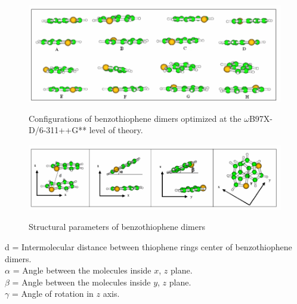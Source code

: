 	
	\begin{figure}[H]
		\centering
		\includegraphics[scale=0.88]{image/image/P1-F6} \label{P1-F6}
		\caption{Configurations of benzothiophene dimers optimized at the $\omega$B97X-D/6-311++G** level of theory.}
	\end{figure}
	
	\begin{figure}[H]
		\centering
		\includegraphics[scale=0.88]{image/image/P1-F7}  \label{P1-F7}
		\caption{Structural parameters of benzothiophene dimers}
	\end{figure}
	
	\noindent d = Intermolecular distance between thiophene rings center of benzothiophene dimers.\\
	$\alpha$ = Angle between the molecules inside $x$, $z$ plane. \\
	$\beta$ = Angle between the molecules inside $y$, $z$ plane.\\
	$\gamma$ = Angle of rotation in $z$ axis.\\
	
